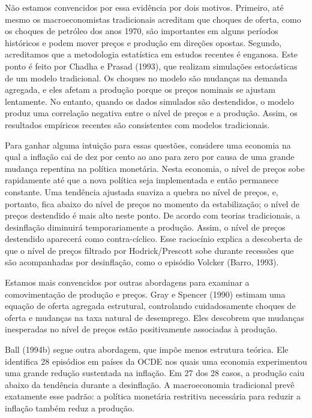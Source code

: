 \documentclass[12pt]{article}
\begin{document}
Não estamos convencidos por essa evidência por dois motivos. Primeiro, até mesmo os macroeconomistas tradicionais acreditam que choques de oferta, como os choques de petróleo dos anos 1970, são importantes em alguns períodos históricos e podem mover preços e produção em direções opostas. Segundo, acreditamos que a metodologia estatística em estudos recentes é enganosa. Este ponto é feito por Chadha e Prasad (1993), que realizam simulações estocásticas de um modelo tradicional. Os choques no modelo são mudanças na demanda agregada, e eles afetam a produção porque os preços nominais se ajustam lentamente. No entanto, quando os dados simulados são destendidos, o modelo produz uma correlação negativa entre o nível de preços e a produção. Assim, os resultados empíricos recentes são consistentes com modelos tradicionais.

Para ganhar alguma intuição para essas questões, considere uma economia na qual a inflação cai de dez por cento ao ano para zero por causa de uma grande mudança repentina na política monetária. Nesta economia, o nível de preços sobe rapidamente até que a nova política seja implementada e então permanece constante. Uma tendência ajustada suaviza a quebra no nível de preços, e, portanto, fica abaixo do nível de preços no momento da estabilização; o nível de preços destendido é mais alto neste ponto. De acordo com teorias tradicionais, a desinflação diminuirá temporariamente a produção. Assim, o nível de preços destendido aparecerá como contra-cíclico. Esse raciocínio explica a descoberta de que o nível de preços filtrado por Hodrick/Prescott sobe durante recessões que são acompanhadas por desinflação, como o episódio Volcker (Barro, 1993).

Estamos mais convencidos por outras abordagens para examinar a comovimentação de produção e preços. Gray e Spencer (1990) estimam uma equação de oferta agregada estrutural, controlando cuidadosamente choques de oferta e mudanças na taxa natural de desemprego. Eles descobrem que mudanças inesperadas no nível de preços estão positivamente associadas à produção.

Ball (1994b) segue outra abordagem, que impõe menos estrutura teórica. Ele identifica 28 episódios em países da OCDE nos quais uma economia experimentou uma grande redução sustentada na inflação. Em 27 dos 28 casos, a produção caiu abaixo da tendência durante a desinflação. A macroeconomia tradicional prevê exatamente esse padrão: a política monetária restritiva necessária para reduzir a inflação também reduz a produção.
\end{document}
